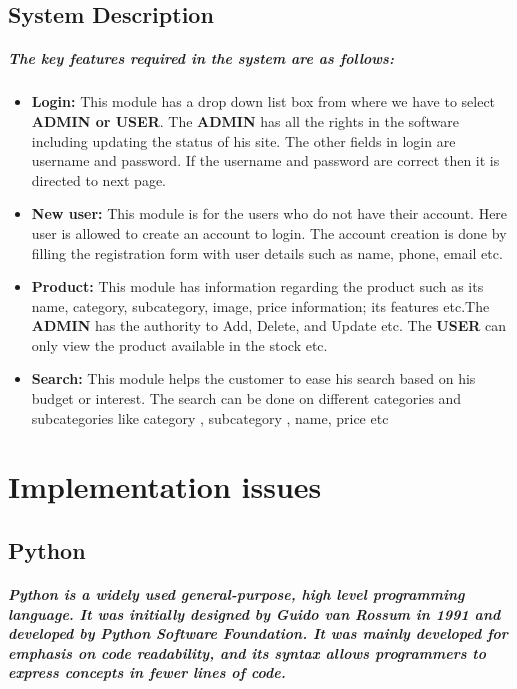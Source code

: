 \documentclass[12pt]{report}
\begin{document}
        \section{System Description}
        \paragraph{The key features required in the system are as follows:}
        \begin{itemize}
            \item \textbf{Login:} This module has a drop down list box from where we have to select \textbf{ADMIN or USER}. The \textbf{ADMIN} has all the rights in the software including updating the status of his site. The other fields in login are username and password. If the username and password are correct then it is directed to next page.
            \item \textbf{New user:} This module is for the users who do not have their account. Here user is allowed to create an account to login. The account creation is done by filling the registration form with user details such as name, phone, email etc.
            \item \textbf{Product:} This module has information regarding the product such as its name, category, subcategory, image, price information; its features etc.The \textbf{ADMIN} has the authority to Add, Delete, and Update etc. The \textbf{USER} can only view the product available in the stock etc.
            \item \textbf{Search:} This module helps the customer to ease his search based on his budget or interest. The search can be done on different categories and subcategories like category , subcategory , name, price etc
        \end{itemize}
    \chapter{Implementation issues}
        \section{Python}
        \paragraph
        {
        Python is a widely used general-purpose, high level programming language. It was initially designed by Guido van Rossum in 1991 and developed by Python Software Foundation. It was mainly developed for emphasis on code readability, and its syntax allows programmers to express concepts in fewer lines of code.
        }
\end{document}
